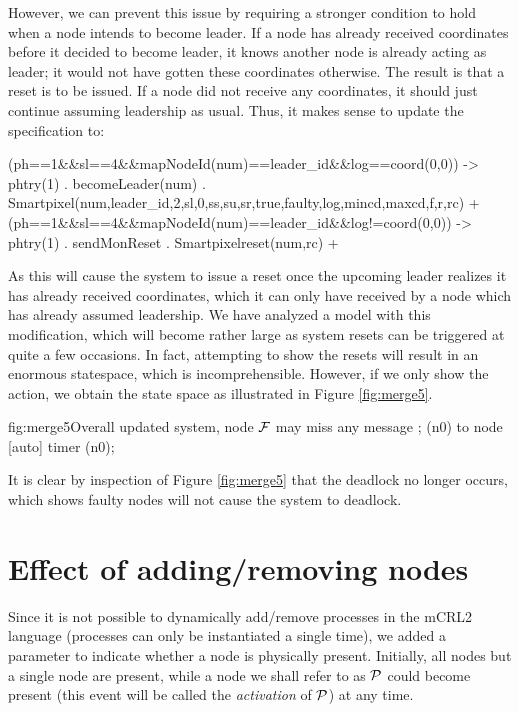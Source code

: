 However, we can prevent this issue by requiring a stronger condition to hold when a node intends to become leader. If a node has already received coordinates before it decided to become leader, it knows another node is already acting as leader; it would not have gotten these coordinates otherwise. The result is that a reset is to be issued. If a node did not receive any coordinates, it should just continue assuming leadership as usual. Thus, it makes sense to update the specification to:

\begin{codeverb}
(ph==1&&sl==4&&mapNodeId(num)==leader_id&&log==coord(0,0)) ->
    phtry(1) . becomeLeader(num) .
     Smartpixel(num,leader_id,2,sl,0,ss,su,sr,true,faulty,log,mincd,maxcd,f,r,rc) +
(ph==1&&sl==4&&mapNodeId(num)==leader_id&&log!=coord(0,0)) ->
    phtry(1) . sendMonReset .
     Smartpixelreset(num,rc) +
\end{codeverb}

As this will cause the system to issue a reset once the upcoming leader realizes it has already received coordinates, which it can only have received by a node which has already assumed leadership. We have analyzed a model with this modification, which will become rather large as system resets can be triggered at quite a few occasions. In fact, attempting to show the resets will result in an enormous statespace, which is incomprehensible. However, if we only show the  action, we obtain the state space as illustrated in Figure \ref{fig:merge5}.

\begin{statespace}{fig:merge5}{Overall updated system, node $\mathcal{F}$ may miss any message}
 ;
  (n0) to node [auto] {timer} (n0);
\end{statespace}

It is clear by inspection of Figure \ref{fig:merge5} that the deadlock no longer occurs, which shows faulty nodes will not cause the system to deadlock.

\section{Effect of adding/removing nodes}
\label{sec:alteringconfig}

Since it is not possible to dynamically add/remove processes in the mCRL2 language (processes can only be instantiated a single time), we added a parameter to indicate whether a node is physically present. Initially, all nodes but a single node are present, while a node we shall refer to as $\mathcal{P}$ could become present (this event will be called the \emph{activation} of $\mathcal{P}$) at any time.

